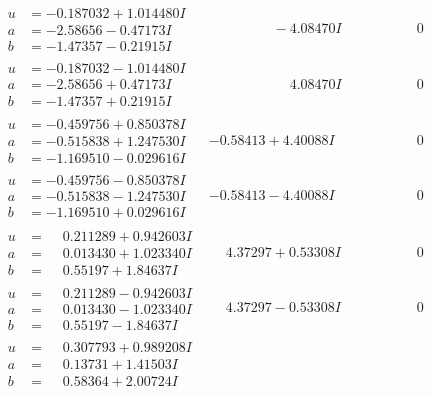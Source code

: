\documentclass[1p]{elsarticle_modified}
\theoremstyle{definition}
\begin{document}
$$\begin{array}{c|c|c}
\begin{aligned}
u &= -0.187032 + 1.014480 I \\
a &= -2.58656 - 0.47173 I \\
b &= -1.47357 - 0.21915 I\end{aligned}
 & \phantom{-0.000000 } -4.08470 I & \phantom{-0.000000 } 0 \\ \hline\begin{aligned}
u &= -0.187032 - 1.014480 I \\
a &= -2.58656 + 0.47173 I \\
b &= -1.47357 + 0.21915 I\end{aligned}
 & \phantom{-0.000000 -}4.08470 I & \phantom{-0.000000 } 0 \\ \hline\begin{aligned}
u &= -0.459756 + 0.850378 I \\
a &= -0.515838 + 1.247530 I \\
b &= -1.169510 - 0.029616 I\end{aligned}
 & -0.58413 + 4.40088 I & \phantom{-0.000000 } 0 \\ \hline\begin{aligned}
u &= -0.459756 - 0.850378 I \\
a &= -0.515838 - 1.247530 I \\
b &= -1.169510 + 0.029616 I\end{aligned}
 & -0.58413 - 4.40088 I & \phantom{-0.000000 } 0 \\ \hline\begin{aligned}
u &= \phantom{-}0.211289 + 0.942603 I \\
a &= \phantom{-}0.013430 + 1.023340 I \\
b &= \phantom{-}0.55197 + 1.84637 I\end{aligned}
 & \phantom{-}4.37297 + 0.53308 I & \phantom{-0.000000 } 0 \\ \hline\begin{aligned}
u &= \phantom{-}0.211289 - 0.942603 I \\
a &= \phantom{-}0.013430 - 1.023340 I \\
b &= \phantom{-}0.55197 - 1.84637 I\end{aligned}
 & \phantom{-}4.37297 - 0.53308 I & \phantom{-0.000000 } 0 \\ \hline\begin{aligned}
u &= \phantom{-}0.307793 + 0.989208 I \\
a &= \phantom{-}0.13731 + 1.41503 I \\
b &= \phantom{-}0.58364 + 2.00724 I\end{aligned}

\end{array}$$
\end{document}
